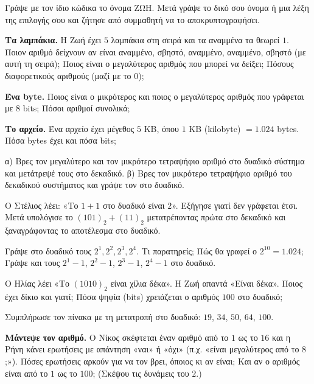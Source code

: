 \ex Γράψε με τον ίδιο κώδικα το όνομα $\mathrm{ΖΩΗ}$. Μετά γράψε το δικό σου όνομα ή μια λέξη της επιλογής σου και ζήτησε από συμμαθητή να το αποκρυπτογραφήσει.

\ex \textbf{Τα λαμπάκια.} Η Ζωή έχει $5$ λαμπάκια στη σειρά και τα αναμμένα τα θεωρεί $1$. Ποιον αριθμό δείχνουν αν είναι αναμμένο, σβηστό, αναμμένο, αναμμένο, σβηστό (με αυτή τη σειρά); Ποιος είναι ο μεγαλύτερος αριθμός που μπορεί να δείξει; Πόσους διαφορετικούς αριθμούς (μαζί με το $0$);

\ex \textbf{Ένα byte.} Ποιος είναι ο μικρότερος και ποιος ο μεγαλύτερος αριθμός που γράφεται με $8$ bits; Πόσοι αριθμοί συνολικά;

\ex \textbf{Το αρχείο.} Ένα αρχείο έχει μέγεθος $5$ KB, όπου $1$ KB (kilobyte) $=1.024$ bytes. Πόσα bytes έχει και πόσα bits;


\ex α) Βρες τον μεγαλύτερο και τον μικρότερο τετραψήφιο αριθμό στο δυαδικό σύστημα και μετάτρεψέ τους στο δεκαδικό. β) Βρες τον μικρότερο τετραψήφιο αριθμό του δεκαδικού συστήματος και γράψε τον στο δυαδικό.

\ex Ο Στέλιος λέει: «Το $1+1$ στο δυαδικό είναι $2$». Εξήγησε γιατί δεν γράφεται έτσι. Μετά υπολόγισε το $(101)_2+(11)_2$ μετατρέποντας πρώτα στο δεκαδικό και ξαναγράφοντας το αποτέλεσμα στο δυαδικό.

\ex Γράψε στο δυαδικό τους $2^1,2^2,2^3,2^4$. Τι παρατηρείς; Πώς θα γραφεί ο $2^{10}=1.024$; Γράψε και τους $2^1-1$, $2^2-1$, $2^3-1$, $2^4-1$ στο δυαδικό.

\ex Ο Ηλίας λέει «Το $(1010)_2$ είναι χίλια δέκα». Η Ζωή απαντά «Είναι δέκα». Ποιος έχει δίκιο και γιατί; Πόσα ψηφία (bits) χρειάζεται ο αριθμός $100$ στο δυαδικό;


\ex Συμπλήρωσε τον πίνακα με τη μετατροπή στο δυαδικό: $19$, $34$, $50$, $64$, $100$.

\ex \textbf{Μάντεψε τον αριθμό.} Ο Νίκος σκέφτεται έναν αριθμό από το $1$ ως το $16$ και η Ρήνη κάνει ερωτήσεις με απάντηση «ναι» ή «όχι» (π.χ. «είναι μεγαλύτερος από το $8$;»). Πόσες ερωτήσεις αρκούν για να τον βρει, όποιος κι αν είναι; Και αν ο αριθμός είναι από το $1$ ως το $100$; (Σκέψου τις δυνάμεις του $2$.)
